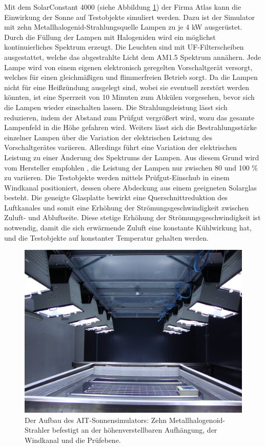 \documentclass[a4paper,bibtotoc,oneside]{scrbook}
\begin{document}
Mit dem SolarConstant 4000 (siehe Abbildung \ref{sunsim}) der Firma Atlas kann die Einwirkung der Sonne auf Testobjekte simuliert werden. Dazu ist der Simulator mit zehn Metallhalogenid-Strahlungsquelle Lampen zu je 4 kW ausgerüstet. Durch die Füllung der Lampen mit Halogeniden wird ein möglichst kontinuierliches Spektrum erzeugt. Die Leuchten sind mit UF-Filterscheiben ausgestattet, welche das abgestrahlte Licht dem AM1.5 Spektrum annähern.
Jede Lampe wird von einem eigenen elektronisch geregelten Vorschaltgerät versorgt, welches für einen gleichmäßigen und flimmerfreien Betrieb sorgt.
Da die Lampen nicht für eine Heißzündung ausgelegt sind, wobei sie eventuell zerstört werden könnten, ist eine Sperrzeit von 10 Minuten zum Abkülen vorgesehen, bevor sich die Lampen wieder einschalten lassen.
Die Strahlungsleistung lässt sich reduzieren, indem der Abstand zum Prüfgut vergrößert wird, wozu das gesamte Lampenfeld in die Höhe gefahren wird.
Weiters lässt sich die Bestrahlungsstärke einzelner Lampen über die Variation der elektrischen Leistung des Vorschaltgerätes variieren.
Allerdings führt eine Variation der elektrischen Leistung zu einer Änderung des Spektrums der Lampen. Aus diesem Grund wird vom Hersteller empfohlen \cite{atlas}, die Leistung der Lampen nur zwischen 80 und 100 \% zu variieren.
Die Testobjekte werden mittels Prüfgut-Einschub in einem Windkanal positioniert, dessen obere Abdeckung aus einem geeigneten Solarglas besteht. Die geneigte Glasplatte bewirkt eine Querschnittreduktion des Luftkanales und somit eine Erhöhung der Strömungsgeschwindigkeit zwischen Zuluft- und Abluftseite. Diese stetige Erhöhung der Strömungsgeschwindigkeit ist notwendig, damit die sich erwärmende Zuluft eine konstante Kühlwirkung hat, und die Testobjekte auf konstanter Temperatur gehalten werden.


\begin{figure}[htbp]
\centering
\includegraphics[width=125mm]{img/sunsimulator.jpg}
\caption[Sonnensimulator]{Der Aufbau des AIT-Sonnensimulators: Zehn Metallhalogenoid-Strahler befestigt an der höhenverstellbaren Aufhängung, der Windkanal und die Prüfebene.}\label{sunsim}
\end{figure}
\end{document}
